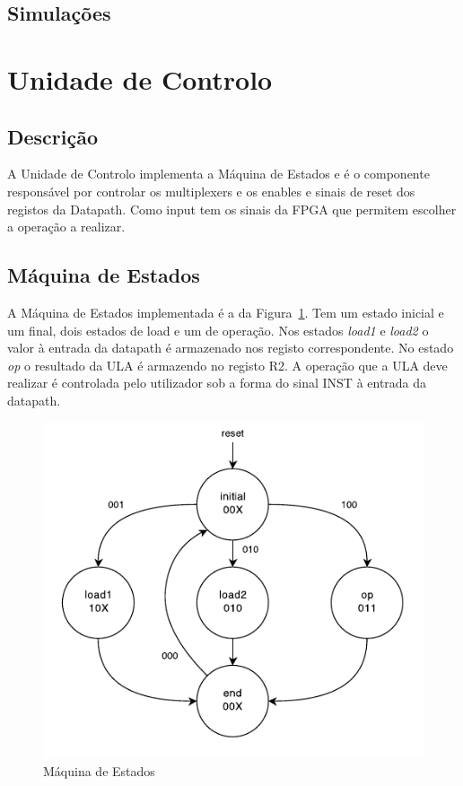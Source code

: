 \documentclass[a4paper]{article}
\begin{document}
\pagebreak
\subsection{Simulações}
\pagebreak


\section{Unidade de Controlo}
\subsection{Descrição}
A Unidade de Controlo implementa a Máquina de Estados e é o componente responsável por controlar os multiplexers e os enables e sinais de reset dos registos da Datapath. Como input tem os sinais da FPGA que permitem escolher a operação a realizar.

\subsection{Máquina de Estados}
A Máquina de Estados implementada é a da Figura~\ref{fig:FSMdiagram}. Tem um estado inicial e um final, dois estados de load e um de operação. Nos estados \textit{load1} e \textit{load2} o valor à entrada da datapath é armazenado nos registo correspondente. No estado \textit{op} o resultado da ULA é armazendo no registo R2. A operação que a ULA deve realizar é controlada pelo utilizador sob a forma do sinal INST à entrada da datapath.

\begin{figure}[h]
	\centering
	\includegraphics[scale=0.3]{FSM}
	\caption{Máquina de Estados}
	\label{fig:FSMdiagram}
\end{figure}
\end{document}
